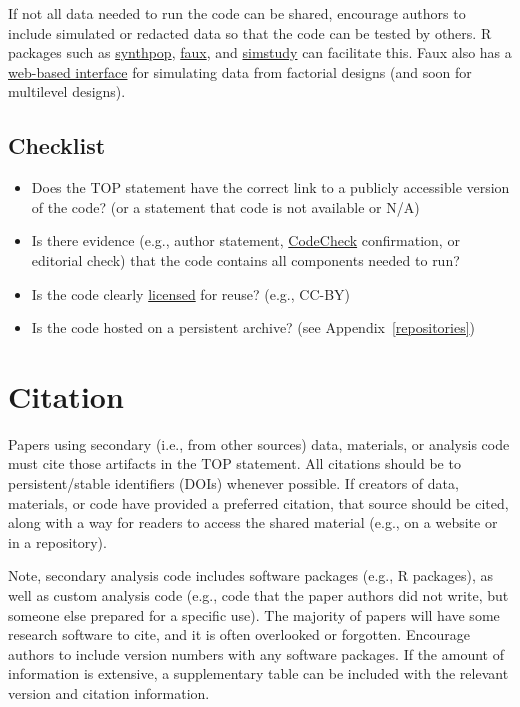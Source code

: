 \documentclass[
  oneside]{book}
\providecommand{\tightlist}{%
  \setlength{\itemsep}{0pt}\setlength{\parskip}{0pt}}
\begin{document}
If not all data needed to run the code can be shared, encourage authors to include simulated or redacted data so that the code can be tested by others. R packages such as \href{https://www.synthpop.org.uk/}{synthpop}, \href{https://debruine.github.io/faux/}{faux}, and \href{https://kgoldfeld.github.io/simstudy/}{simstudy} can facilitate this. Faux also has a \href{https://shiny.psy.gla.ac.uk/debruine/fauxapp/}{web-based interface} for simulating data from factorial designs (and soon for multilevel designs).

\hypertarget{checklist-3}{%
\section{Checklist}\label{checklist-3}}

\begin{itemize}
\tightlist
\item
  Does the TOP statement have the correct link to a publicly accessible version of the code? (or a statement that code is not available or N/A)
\item
  Is there evidence (e.g., author statement, \href{https://codecheck.org.uk/}{CodeCheck} confirmation, or editorial check) that the code contains all components needed to run?
\item
  Is the code clearly \href{https://www.ucl.ac.uk/library/research-support/research-data-management/licenses-data-sharing-creative-commons}{licensed} for reuse? (e.g., CC-BY)
\item
  Is the code hosted on a persistent archive? (see Appendix~\ref{repositories})
\end{itemize}

\hypertarget{citation}{%
\chapter{Citation}\label{citation}}

Papers using secondary (i.e., from other sources) data, materials, or analysis code must cite those artifacts in the TOP statement. All citations should be to persistent/stable identifiers (DOIs) whenever possible. If creators of data, materials, or code have provided a preferred citation, that source should be cited, along with a way for readers to access the shared material (e.g., on a website or in a repository).

Note, secondary analysis code includes software packages (e.g., R packages), as well as custom analysis code (e.g., code that the paper authors did not write, but someone else prepared for a specific use). The majority of papers will have some research software to cite, and it is often overlooked or forgotten. Encourage authors to include version numbers with any software packages. If the amount of information is extensive, a supplementary table can be included with the relevant version and citation information.
\end{document}
